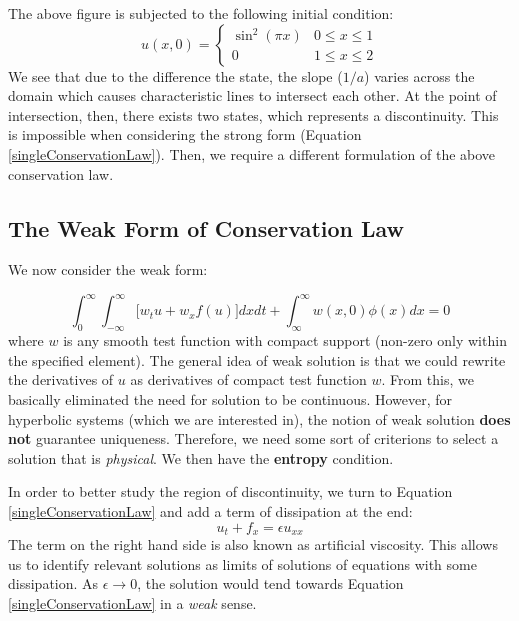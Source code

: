 \documentclass[a4paper]{article}
\numberwithin{equation}{section}
\begin{document}
The above figure is subjected to the following initial condition:
\begin{equation}
    u(x,0) = 
    \begin{cases}
        \sin^2 (\pi x) & 0 \leq x \leq 1 \\
        0 & 1 \leq x \leq 2
    \end{cases}
\end{equation}
We see that due to the difference the state, the slope ($1/a$) varies across the domain which causes characteristic lines to intersect each other. At the point of intersection, then, there exists two states, which represents a discontinuity. This is impossible when considering the strong form (Equation \ref{singleConservationLaw}). Then, we require a different formulation of the above conservation law.
\subsection{The Weak Form of Conservation Law}
We now consider the weak form:

\begin{equation}\label{eq:integralConservationLaw}
    \int_{0}^{\infty} \int_{-\infty}^{\infty} \big[w_t u + w_x f(u) \big] dx dt + \int_{\infty}^\infty w(x,0) \phi(x) dx = 0
\end{equation}
where $w$ is any smooth test function with compact support (non-zero only within the specified element). The general idea of weak solution is that we could rewrite the derivatives of $u$ as derivatives of compact test function $w$. From this, we basically eliminated the need for solution to be continuous. However, for hyperbolic systems (which we are interested in), the notion of weak solution \textbf{does not} guarantee uniqueness. Therefore, we need some sort of criterions to select a solution that is \textit{physical}. We then have the \textbf{entropy} condition. 

In order to better study the region of discontinuity, we turn to Equation \ref{singleConservationLaw} and add a term of dissipation at the end:
\begin{equation} \label{eq:artificial_viscosity}
   u_t + f_x = \epsilon u_{xx}
\end{equation}
The term on the right hand side is also known as artificial viscosity. This allows us to identify relevant solutions as limits of solutions of equations with some dissipation. As $\epsilon \rightarrow 0$, the solution would tend towards Equation \ref{singleConservationLaw} in a \textit{weak} sense. 
\end{document}
